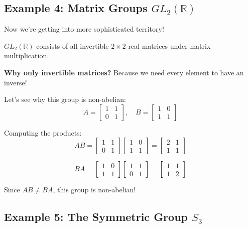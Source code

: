 \documentclass[12pt]{article}
\begin{document}
\subsection{\textcolor{HeaderColor}{Example 4: Matrix Groups $GL_2(\mathbb{R})$}}

Now we're getting into more sophisticated territory!

\begin{examplebox}
$GL_2(\mathbb{R})$ consists of all invertible $2 \times 2$ real matrices under matrix multiplication.

\textbf{Why only invertible matrices?} Because we need every element to have an inverse!

Let's see why this group is non-abelian:
\[
A = \begin{bmatrix} 1 & 1 \\ 0 & 1 \end{bmatrix}, \quad B = \begin{bmatrix} 1 & 0 \\ 1 & 1 \end{bmatrix}
\]

Computing the products:
\[
AB = \begin{bmatrix} 1 & 1 \\ 0 & 1 \end{bmatrix} \begin{bmatrix} 1 & 0 \\ 1 & 1 \end{bmatrix} = \begin{bmatrix} 2 & 1 \\ 1 & 1 \end{bmatrix}
\]

\[
BA = \begin{bmatrix} 1 & 0 \\ 1 & 1 \end{bmatrix} \begin{bmatrix} 1 & 1 \\ 0 & 1 \end{bmatrix} = \begin{bmatrix} 1 & 1 \\ 1 & 2 \end{bmatrix}
\]

Since $AB \neq BA$, this group is non-abelian!
\end{examplebox}

\subsection{\textcolor{HeaderColor}{Example 5: The Symmetric Group $S_3$}}
\end{document}
